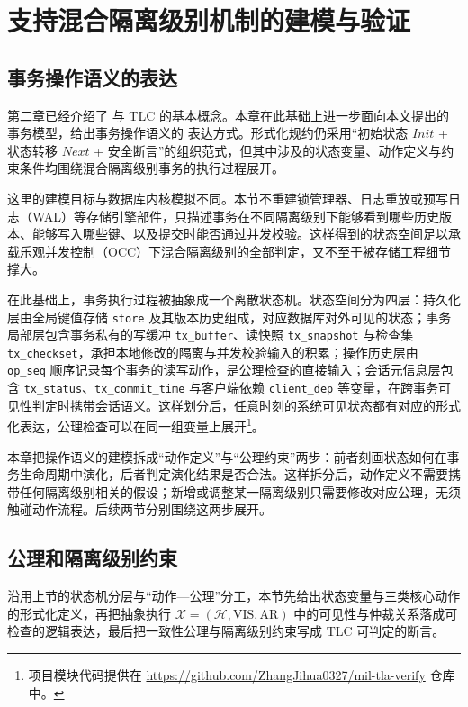 \chapter{支持混合隔离级别机制的\TLAPlus 建模与验证}

\section{事务操作语义的\TLAPlus 表达}

第二章已经介绍了 \TLAPlus 与 TLC 的基本概念。本章在此基础上进一步面向本文提出的事务模型，给出事务操作语义的 \TLAPlus 表达方式。形式化规约仍采用``初始状态 $Init$ + 状态转移 $Next$ + 安全断言''的组织范式，但其中涉及的状态变量、动作定义与约束条件均围绕混合隔离级别事务的执行过程展开。

这里的建模目标与数据库内核模拟不同。本节不重建锁管理器、日志重放或预写日志（WAL）等存储引擎部件，只描述事务在不同隔离级别下能够看到哪些历史版本、能够写入哪些键、以及提交时能否通过并发校验。这样得到的状态空间足以承载乐观并发控制（OCC）下混合隔离级别的全部判定，又不至于被存储工程细节撑大。

在此基础上，事务执行过程被抽象成一个离散状态机。状态空间分为四层：持久化层由全局键值存储 \texttt{store} 及其版本历史组成，对应数据库对外可见的状态；事务局部层包含事务私有的写缓冲 \texttt{tx\_buffer}、读快照 \texttt{tx\_snapshot} 与检查集 \texttt{tx\_checkset}，承担本地修改的隔离与并发校验输入的积累；操作历史层由 \texttt{op\_seq} 顺序记录每个事务的读写动作，是公理检查的直接输入；会话元信息层包含 \texttt{tx\_status}、\texttt{tx\_commit\_time} 与客户端依赖 \texttt{client\_dep} 等变量，在跨事务可见性判定时携带会话语义。这样划分后，任意时刻的系统可见状态都有对应的形式化表达，公理检查可以在同一组变量上展开\footnote{项目模块代码提供在 \url{https://github.com/ZhangJihua0327/mil-tla-verify} 仓库中。}。

本章把操作语义的建模拆成``动作定义''与``公理约束''两步：前者刻画状态如何在事务生命周期中演化，后者判定演化结果是否合法。这样拆分后，动作定义不需要携带任何隔离级别相关的假设；新增或调整某一隔离级别只需要修改对应公理，无须触碰动作流程。后续两节分别围绕这两步展开。

\section{公理和隔离级别约束}
\label{sec:tla-axioms}

沿用上节的状态机分层与``动作—公理''分工，本节先给出状态变量与三类核心动作的形式化定义，再把抽象执行 $\mathcal{X} = (\mathcal{H}, \text{VIS}, \text{AR})$ 中的可见性与仲裁关系落成可检查的逻辑表达，最后把一致性公理与隔离级别约束写成 TLC 可判定的断言。
